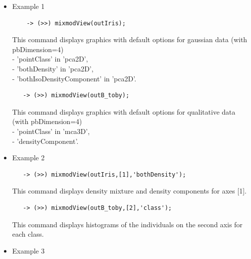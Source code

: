 \begin{itemize}
\item Example 1

{\scriptsize
\begin{verbatim}
    -> (>>) mixmodView(outIris);
\end{verbatim}}

\vspace{-0.5cm}


This command displays graphics with default options for gaussian data (with pbDimension=4) \\
 - 'pointClass' in 'pca2D',\\
 - 'bothDensity' in 'pca2D',\\
 - 'bothIsoDensityComponent' in 'pca2D'.\\

{\scriptsize
 \begin{verbatim}
   -> (>>) mixmodView(outB_toby);
 \end{verbatim}
}
\vspace{-0.5cm}
This command displays graphics with default options for qualitative data (with pbDimension=4) \\
- 'pointClass' in 'mca3D',\\
- 'densityComponent'.

 \item Example 2
{\scriptsize
 \begin{verbatim}
   -> (>>) mixmodView(outIris,[1],'bothDensity');
 \end{verbatim}
}

This command displays density mixture and density components for axes [1].\\


{\scriptsize
 \begin{verbatim}
   -> (>>) mixmodView(outB_toby,[2],'class');
 \end{verbatim}
}


This command displays histograms of the individuals on the second axis for each class.\\










 \item Example 3


\end{itemize}
